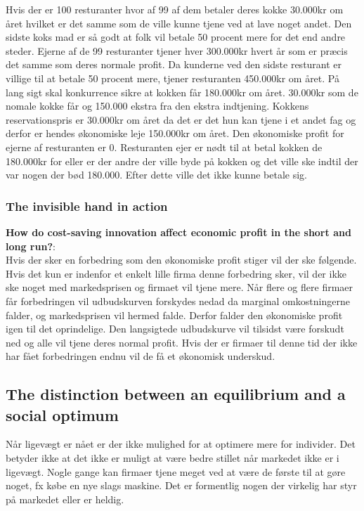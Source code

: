 \begin{eks} \textbf{} %
\newline
Hvis der er 100 resturanter hvor af 99 af dem betaler deres kokke 30.000kr om året hvilket er det samme som de ville kunne tjene ved at lave noget andet. Den sidste koks mad er så godt at folk vil betale 50 procent mere for det end andre steder. Ejerne af de 99 resturanter tjener hver 300.000kr hvert år som er præcis det samme som deres normale profit. Da kunderne ved den sidste resturant er villige til at betale 50 procent mere, tjener resturanten 450.000kr om året. På lang sigt skal konkurrence sikre at kokken får 180.000kr om året. 30.000kr som de nomale kokke får og 150.000 ekstra fra den ekstra indtjening. Kokkens reservationspris er 30.000kr om året da det er det hun kan tjene i et andet fag og derfor er hendes økonomiske leje 150.000kr om året. Den økonomiske profit for ejerne af resturanten er 0. Resturanten ejer er nødt til at betal kokken de 180.000kr for eller er der andre der ville byde på kokken og det ville ske indtil der var nogen der bød 180.000. Efter dette ville det ikke kunne betale sig.
\end{eks}

\subsubsection{The invisible hand in action}
\textbf{How do cost-saving innovation affect economic profit in the short and long run?}:\\
Hvis der sker en forbedring som den økonomiske profit stiger vil der ske følgende. Hvis det kun er indenfor et enkelt lille firma denne forbedring sker, vil der ikke ske noget med markedsprisen og firmaet vil tjene mere. Når flere og flere firmaer får forbedringen vil udbudskurven forskydes nedad da marginal omkostningerne falder, og markedsprisen vil hermed falde. Derfor falder den økonomiske profit igen til det oprindelige. Den langsigtede udbudskurve vil tilsidst være forskudt ned og alle vil tjene deres normal profit. Hvis der er firmaer til denne tid der ikke har fået forbedringen endnu vil de få et økonomisk underskud. 

\subsection{The distinction between an equilibrium and a social optimum}
Når ligevægt er nået er der ikke mulighed for at optimere mere for individer. Det betyder ikke at det ikke er muligt at være bedre stillet når markedet ikke er i ligevægt. Nogle gange kan firmaer tjene meget ved at være de første til at gøre noget, fx købe en nye slags maskine. Det er formentlig nogen der virkelig har styr på markedet eller er heldig. 

